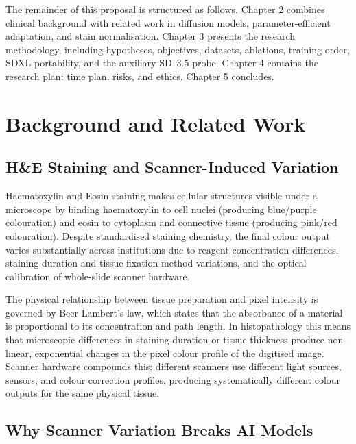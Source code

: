 \documentclass[a4paper,twoside,12pt]{report}
\begin{document}
The remainder of this proposal is structured as follows. Chapter 2 combines clinical background with related work in diffusion models, parameter-efficient adaptation, and stain normalisation. Chapter 3 presents the research methodology, including hypotheses, objectives, datasets, ablations, training order, SDXL portability, and the auxiliary SD~3.5 probe. Chapter 4 contains the research plan: time plan, risks, and ethics. Chapter 5 concludes.

\chapter{Background and Related Work}

\section{H\&E Staining and Scanner-Induced Variation}

Haematoxylin and Eosin staining makes cellular structures visible under a microscope by binding haematoxylin to cell nuclei (producing blue/purple colouration) and eosin to cytoplasm and connective tissue (producing pink/red colouration). Despite standardised staining chemistry, the final colour output varies substantially across institutions due to reagent concentration differences, staining duration and tissue fixation method variations, and the optical calibration of whole-slide scanner hardware.

The physical relationship between tissue preparation and pixel intensity is governed by Beer-Lambert's law, which states that the absorbance of a material is proportional to its concentration and path length. In histopathology this means that microscopic differences in staining duration or tissue thickness produce non-linear, exponential changes in the pixel colour profile of the digitised image. Scanner hardware compounds this: different scanners use different light sources, sensors, and colour correction profiles, producing systematically different colour outputs for the same physical tissue.

\section{Why Scanner Variation Breaks AI Models}
\end{document}
